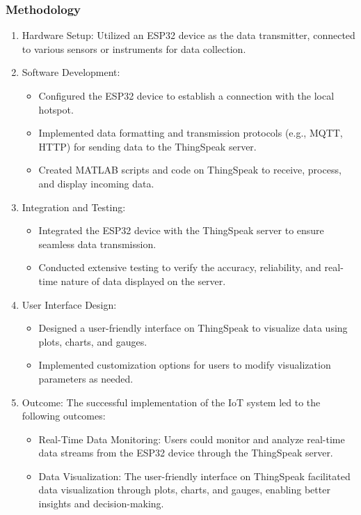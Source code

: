 \documentclass[12pt]{article} %
\begin{document}
\subsubsection{Methodology}
\begin{enumerate}
    \item Hardware Setup: Utilized an ESP32 device as the data transmitter, connected to various sensors or instruments for data collection.
    \item Software Development:
    \begin{itemize}
        \item Configured the ESP32 device to establish a connection with the local hotspot.
        \item Implemented data formatting and transmission protocols (e.g., MQTT, HTTP) for sending data to the ThingSpeak server.
        \item Created MATLAB scripts and code on ThingSpeak to receive, process, and display incoming data.
    \end{itemize}
    \item Integration and Testing:
    \begin{itemize}
        \item Integrated the ESP32 device with the ThingSpeak server to ensure seamless data transmission.
        \item Conducted extensive testing to verify the accuracy, reliability, and real-time nature of data displayed on the server.
    \end{itemize}
    \item User Interface Design:
    \begin{itemize}
        \item Designed a user-friendly interface on ThingSpeak to visualize data using plots, charts, and gauges.
        \item Implemented customization options for users to modify visualization parameters as needed.
    \end{itemize}
    \item Outcome: The successful implementation of the IoT system led to the following outcomes:
    \begin{itemize}
        \item Real-Time Data Monitoring: Users could monitor and analyze real-time data streams from the ESP32 device through the ThingSpeak server.
        \item Data Visualization: The user-friendly interface on ThingSpeak facilitated data visualization through plots, charts, and gauges, enabling better insights and decision-making.
    \end{itemize}
\end{enumerate}
\end{document}
